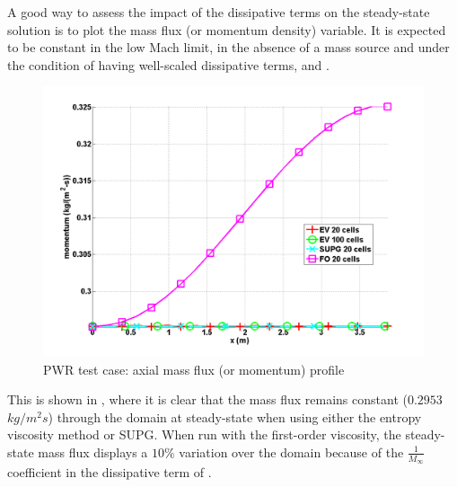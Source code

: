 A good way to assess the impact of the dissipative terms on the steady-state solution is to plot the mass flux (or momentum density) variable. It is expected to be constant in the low Mach limit, in the absence of a mass source and under the condition of having well-scaled dissipative terms,  and .
%
\begin{figure}[H]
\centering
\includegraphics[width=\textwidth]{figures/PWR_stt_momentum.png}
\caption{PWR test case: axial mass flux (or momentum) profile}
\label{fig:Momentum}
\end{figure}
%
This is shown in , where it is clear that the mass flux remains constant ($0.2953$ $kg/m^2s$) through the domain at steady-state when using either the entropy viscosity method or SUPG. When run with the first-order viscosity, the steady-state mass flux displays a $10\%$ variation over the domain because of the $\frac{1}{M_\infty}$ coefficient in the dissipative term of .
%
